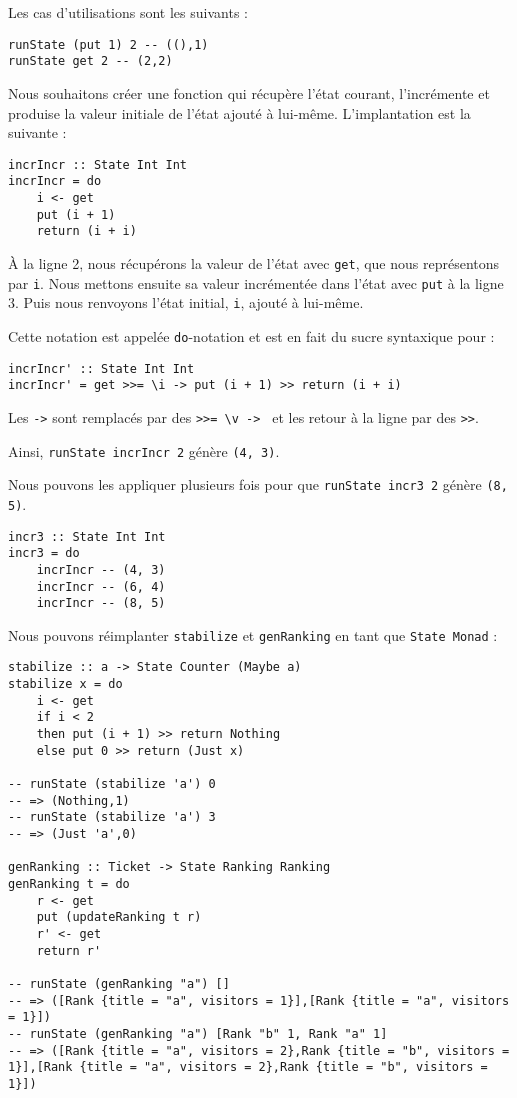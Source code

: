 \documentclass{llncs}
\begin{document}
Les cas d'utilisations sont les suivants :
\begin{lstlisting}
runState (put 1) 2 -- ((),1)
runState get 2 -- (2,2)
\end{lstlisting}

Nous souhaitons créer une fonction qui récupère l'état courant,
l'incrémente et produise la valeur initiale de l'état ajouté à lui-même.
L'implantation est la suivante :
\begin{lstlisting}
incrIncr :: State Int Int
incrIncr = do
    i <- get
    put (i + 1)
    return (i + i)
\end{lstlisting}
À la ligne 2, nous récupérons la valeur de l'état avec \lstinline{get}, que nous
représentons par \lstinline{i}.
Nous mettons ensuite sa valeur incrémentée dans l'état avec \lstinline{put} à la
ligne 3.
Puis nous renvoyons l'état initial, \lstinline{i}, ajouté à lui-même.

Cette notation est appelée \lstinline{do}-notation et est en fait du sucre syntaxique
pour :
\begin{lstlisting}
incrIncr' :: State Int Int
incrIncr' = get >>= \i -> put (i + 1) >> return (i + i)
\end{lstlisting}
Les \lstinline{->} sont remplacés par des \lstinline{>>= \v -> } et les retour à
la ligne par des \lstinline{>>}.

Ainsi, \lstinline{runState incrIncr 2} génère \lstinline{(4, 3)}.

Nous pouvons les appliquer plusieurs fois pour que \lstinline{runState incr3 2} génère \lstinline{(8, 5)}.
\begin{lstlisting}
incr3 :: State Int Int
incr3 = do
    incrIncr -- (4, 3)
    incrIncr -- (6, 4)
    incrIncr -- (8, 5)
\end{lstlisting}

Nous pouvons réimplanter \lstinline{stabilize} et \lstinline{genRanking} en tant
que \lstinline{State Monad} :
\begin{lstlisting}
stabilize :: a -> State Counter (Maybe a)
stabilize x = do
    i <- get
    if i < 2
    then put (i + 1) >> return Nothing
    else put 0 >> return (Just x)

-- runState (stabilize 'a') 0
-- => (Nothing,1)
-- runState (stabilize 'a') 3
-- => (Just 'a',0)

genRanking :: Ticket -> State Ranking Ranking
genRanking t = do
    r <- get
    put (updateRanking t r)
    r' <- get
    return r'

-- runState (genRanking "a") []
-- => ([Rank {title = "a", visitors = 1}],[Rank {title = "a", visitors = 1}])
-- runState (genRanking "a") [Rank "b" 1, Rank "a" 1] 
-- => ([Rank {title = "a", visitors = 2},Rank {title = "b", visitors = 1}],[Rank {title = "a", visitors = 2},Rank {title = "b", visitors = 1}])
\end{lstlisting}
\end{document}
